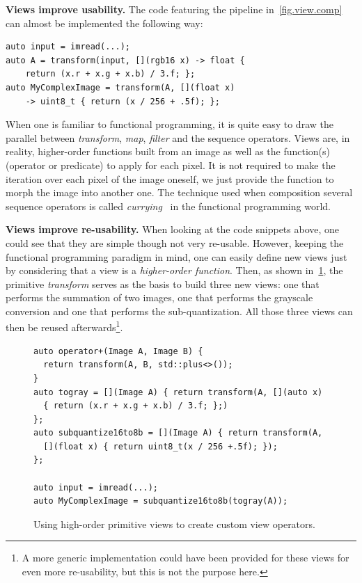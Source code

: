 \textbf{Views improve usability.} The code featuring the pipeline in~\cref{fig.view.comp} can almost be implemented the
following way:
\begin{verbatim}
auto input = imread(...);
auto A = transform(input, [](rgb16 x) -> float {
    return (x.r + x.g + x.b) / 3.f; };
auto MyComplexImage = transform(A, [](float x)
    -> uint8_t { return (x / 256 + .5f); };
\end{verbatim}
When one is familiar to functional programming, it is quite easy to draw the parallel between \emph{transform},
\emph{map}, \emph{filter} and the sequence operators. Views are, in reality, higher-order functions built from an image
as well as the function(s) (operator or predicate) to apply for each pixel. It is not required to make the iteration
over each pixel of the image oneself, we just provide the function to morph the image into another one. The technique
used when composition several sequence operators is called \emph{currying}~\cite{hanus.1995.curry} in the functional
programming world.

\textbf{Views improve re-usability.} When looking at the code snippets above, one could see that they are simple though
not very re-usable. However, keeping the functional programming paradigm in mind, one can easily define new views just
by considering that a view is a \emph{higher-order function}. Then, as shown in~\cref{fig.view.highorder}, the primitive
\emph{transform} serves as the basis to build three new views: one that performs the summation of two images, one that
performs the grayscale conversion and one that performs the sub-quantization. All those three views can then be reused
afterwards\footnote{A more generic implementation could have been provided for these views for even more re-usability,
  but this is not the purpose here.}.

\begin{figure}
  \noindent
  \begin{verbatim}
auto operator+(Image A, Image B) {
  return transform(A, B, std::plus<>());
}
auto togray = [](Image A) { return transform(A, [](auto x)
  { return (x.r + x.g + x.b) / 3.f; };)
};
auto subquantize16to8b = [](Image A) { return transform(A,
  [](float x) { return uint8_t(x / 256 +.5f); });
};

auto input = imread(...);
auto MyComplexImage = subquantize16to8b(togray(A));
  \end{verbatim}

  \caption{Using high-order primitive views to create custom view operators.}
  \label{fig.view.highorder}
\end{figure}

